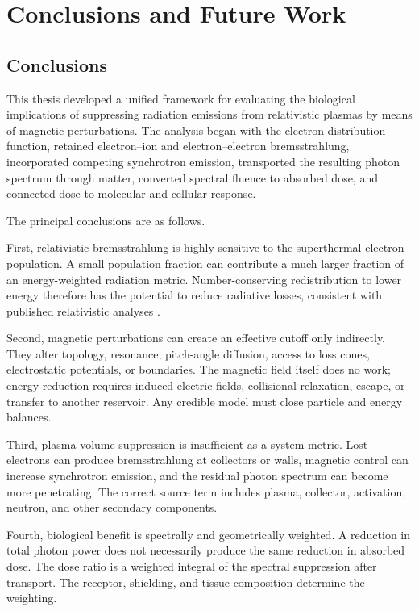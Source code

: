 \chapter{Conclusions and Future Work}
\label{ch:conclusions}

\section{Conclusions}

This thesis developed a unified framework for evaluating the biological implications of suppressing radiation emissions from relativistic plasmas by means of magnetic perturbations. The analysis began with the electron distribution function, retained electron--ion and electron--electron bremsstrahlung, incorporated competing synchrotron emission, transported the resulting photon spectrum through matter, converted spectral fluence to absorbed dose, and connected dose to molecular and cellular response.

The principal conclusions are as follows.

First, relativistic bremsstrahlung is highly sensitive to the superthermal electron population. A small population fraction can contribute a much larger fraction of an energy-weighted radiation metric. Number-conserving redistribution to lower energy therefore has the potential to reduce radiative losses, consistent with published relativistic analyses \cite{munirov2023}.

Second, magnetic perturbations can create an effective cutoff only indirectly. They alter topology, resonance, pitch-angle diffusion, access to loss cones, electrostatic potentials, or boundaries. The magnetic field itself does no work; energy reduction requires induced electric fields, collisional relaxation, escape, or transfer to another reservoir. Any credible model must close particle and energy balances.

Third, plasma-volume suppression is insufficient as a system metric. Lost electrons can produce bremsstrahlung at collectors or walls, magnetic control can increase synchrotron emission, and the residual photon spectrum can become more penetrating. The correct source term includes plasma, collector, activation, neutron, and other secondary components.

Fourth, biological benefit is spectrally and geometrically weighted. A reduction in total photon power does not necessarily produce the same reduction in absorbed dose. The dose ratio is a weighted integral of the spectral suppression after transport. The receptor, shielding, and tissue composition determine the weighting.

